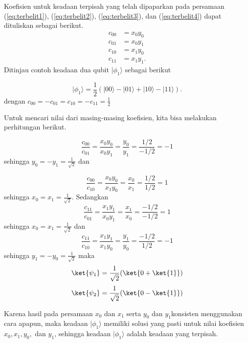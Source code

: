 Koefisien untuk keadaan terpisah yang telah dipaparkan pada persamaan (\ref{eq:terbelit1}), (\ref{eq:terbelit2}), (\ref{eq:terbelit3}), dan (\ref{eq:terbelit4}) dapat dituliskan sebagai berikut.
\begin{align}
	c_{00} &= x_0 y_0 \nonumber \\
	c_{01} &= x_0 y_1 \nonumber \\
	c_{10} &= x_1 y_0 \nonumber \\
	c_{11} &= x_1 y_1 \label{koefisien2qubit}.
\end{align}
Ditinjau contoh keadaan dua qubit $|\phi_1\rangle$ sebagai berikut

\begin{equation}
|\phi_1\rangle =
\frac{1}{2}
\left(
|00\rangle - |01\rangle + |10\rangle - |11\rangle
\right).
\end{equation}
dengan $c_{00}=-c_{01}=c_{10}=-c_{11}=\frac{1}{2}$

Untuk mencari nilai dari masing-masing koefisien, kita bisa melakukan perhitungan berikut.

\begin{equation}
\frac{c_{00}}{c_{01}}=\frac{x_0y_0}{x_0y_1} = \frac{y_0}{y_1}=\frac{1/2}{-1/2}=-1
\end{equation}
sehingga $y_0=-y_1=\frac{1}{\sqrt{2}}$ dan

\begin{equation}
	\frac{c_{00}}{c_{10}}=\frac{x_0y_0}{x_1y_0} = \frac{x_0}{x_1}=\frac{1/2}{1/2}=1
\end{equation}
sehingga $x_0=x_1=\frac{1}{\sqrt{2}}$.
Sedangkan
\begin{equation}
	\frac{c_{11}}{c_{01}}=\frac{x_1y_1}{x_0y_1} = \frac{x_1}{x_0}=\frac{-1/2}{-1/2}=1
\end{equation}
sehingga $x_0=x_1=\frac{1}{\sqrt{2}}$ dan
\begin{equation}
	\frac{c_{11}}{c_{10}}=\frac{x_1y_1}{x_1y_0} = \frac{y_1}{y_0}=\frac{-1/2}{1/2}=-1
\end{equation}
sehingga $y_1=-y_0=\frac{1}{\sqrt{2}}$
maka
\begin{equation}
	\ket{\psi_1}=\frac{1}{\sqrt{2}}(\ket{0+\ket{1}})
\end{equation}
\begin{equation}
	\ket{\psi_2}=\frac{1}{\sqrt{2}}(\ket{0-\ket{1}})
\end{equation}

Karena hasil pada persamaan $x_0$ dan $x_1$ serta $y_0$ dan $y_1$konsisten menggunakan cara apapun, maka keadaan $|\phi_1\rangle$ memiliki solusi yang pasti untuk nilai koefisien $x_0, x_1, y_0,$ dan $y_1$,
sehingga keadaan $|\phi_1\rangle$ adalah keadaan yang terpisah.

